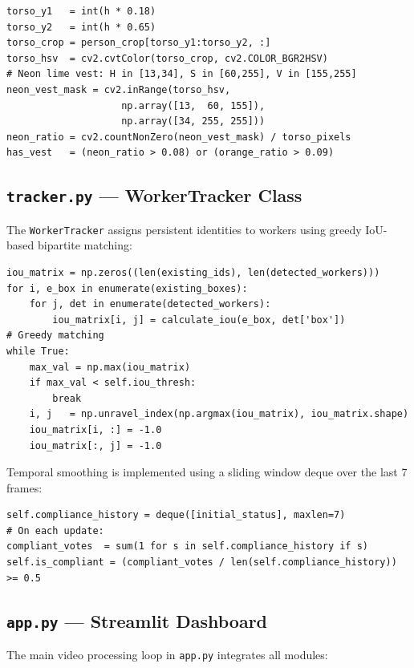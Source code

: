 \documentclass[12pt,a4paper]{report}
\begin{document}
\begin{lstlisting}[caption={HSV Safety Vest detection in torso region (detector.py)}]
torso_y1   = int(h * 0.18)
torso_y2   = int(h * 0.65)
torso_crop = person_crop[torso_y1:torso_y2, :]
torso_hsv  = cv2.cvtColor(torso_crop, cv2.COLOR_BGR2HSV)
# Neon lime vest: H in [13,34], S in [60,255], V in [155,255]
neon_vest_mask = cv2.inRange(torso_hsv,
                    np.array([13,  60, 155]),
                    np.array([34, 255, 255]))
neon_ratio = cv2.countNonZero(neon_vest_mask) / torso_pixels
has_vest   = (neon_ratio > 0.08) or (orange_ratio > 0.09)
\end{lstlisting}

\subsection*{\texttt{tracker.py} — WorkerTracker Class}

The \texttt{WorkerTracker} assigns persistent identities to workers using greedy IoU-based bipartite matching:

\begin{lstlisting}[caption={IoU-based worker identity matching (tracker.py)}]
iou_matrix = np.zeros((len(existing_ids), len(detected_workers)))
for i, e_box in enumerate(existing_boxes):
    for j, det in enumerate(detected_workers):
        iou_matrix[i, j] = calculate_iou(e_box, det['box'])
# Greedy matching
while True:
    max_val = np.max(iou_matrix)
    if max_val < self.iou_thresh:
        break
    i, j   = np.unravel_index(np.argmax(iou_matrix), iou_matrix.shape)
    iou_matrix[i, :] = -1.0
    iou_matrix[:, j] = -1.0
\end{lstlisting}

Temporal smoothing is implemented using a sliding window deque over the last 7 frames:

\begin{lstlisting}[caption={Temporal smoothing via majority vote (tracker.py)}]
self.compliance_history = deque([initial_status], maxlen=7)
# On each update:
compliant_votes  = sum(1 for s in self.compliance_history if s)
self.is_compliant = (compliant_votes / len(self.compliance_history)) >= 0.5
\end{lstlisting}

\subsection*{\texttt{app.py} — Streamlit Dashboard}

The main video processing loop in \texttt{app.py} integrates all modules:
\end{document}
